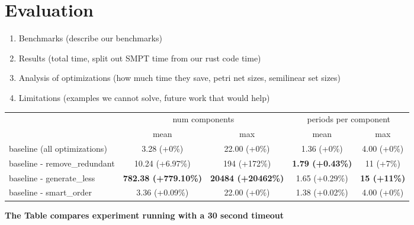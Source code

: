 \section{Evaluation}
\label{sec:evaluation}

\begin{enumerate}
    \item Benchmarks (describe our benchmarks)
    \item Results (total time, split out SMPT time from our rust code time)
    \item Analysis of optimizations (how much time they save, petri net sizes, semilinear set sizes)
    \item Limitations (examples we cannot solve, future work that would help)
\end{enumerate}





\begin{tabular}{l c c c c}
	\toprule
	& \multicolumn{2}{c}{num components} & \multicolumn{2}{c}{periods per component} \\
	\cmidrule(lr){2-3} \cmidrule(lr){4-5}
	& mean & max & mean & max \\
	\midrule
	baseline (all optimizations)    &  3.28 (+0\%) &  22.00 (+0\%) & 1.36 (+0\%) &  4.00 (+0\%) \\
	baseline - remove\_redundant & 10.24 (+6.97\%) & 194 (+172\%)& \textbf{1.79 (+0.43\%)} & 11 (+7\%) \\
	baseline - generate\_less    &\textbf{782.38 (+779.10\%)}&\textbf{20484 (+20462\%)}&1.65 (+0.29\%)& \textbf{15 (+11\%)} \\
	baseline - smart\_order      &  3.36 (+0.09\%) &  22.00 (+0\%) & 1.38 (+0.02\%) &  4.00 (+0\%) \\
	\bottomrule
\end{tabular}
\textbf{The Table compares experiment running with a 30 second timeout}



\newpage